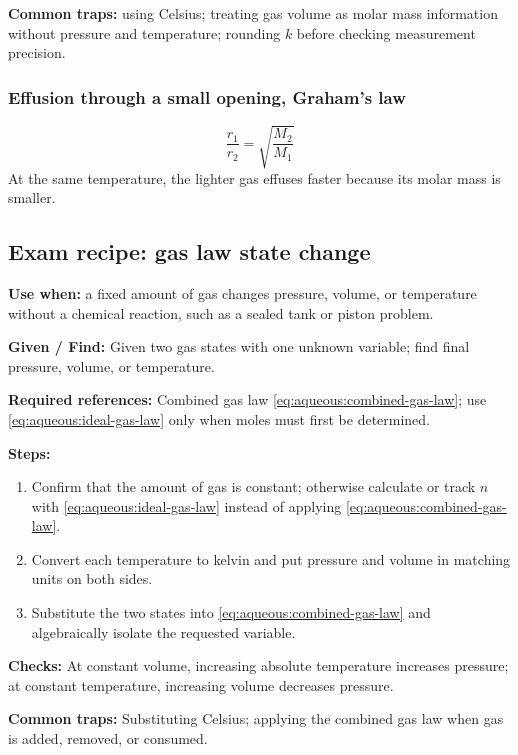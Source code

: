 \textbf{Common traps:} using Celsius; treating gas volume as molar mass information without pressure and temperature; rounding \(k\) before checking measurement precision.

\subsubsection{Effusion through a small opening, Graham's law}
\begin{equation}\label{eq:aqueous:graham-effusion}
\frac{r_1}{r_2}=\sqrt{\frac{M_2}{M_1}}
\end{equation}
At the same temperature, the lighter gas effuses faster because its molar mass is smaller.

\subsection{Exam recipe: gas law state change}
\textbf{Use when:} a fixed amount of gas changes pressure, volume, or temperature without a chemical reaction, such as a sealed tank or piston problem.

\textbf{Given / Find:} Given two gas states with one unknown variable; find final pressure, volume, or temperature.

\textbf{Required references:} Combined gas law \eqref{eq:aqueous:combined-gas-law}; use \eqref{eq:aqueous:ideal-gas-law} only when moles must first be determined.


\textbf{Steps:}
\begin{enumerate}
    \item Confirm that the amount of gas is constant; otherwise calculate or track \(n\) with \eqref{eq:aqueous:ideal-gas-law} instead of applying \eqref{eq:aqueous:combined-gas-law}.
    \item Convert each temperature to kelvin and put pressure and volume in matching units on both sides.
    \item Substitute the two states into \eqref{eq:aqueous:combined-gas-law} and algebraically isolate the requested variable.
\end{enumerate}

\textbf{Checks:} At constant volume, increasing absolute temperature increases pressure; at constant temperature, increasing volume decreases pressure.

\textbf{Common traps:} Substituting Celsius; applying the combined gas law when gas is added, removed, or consumed.

